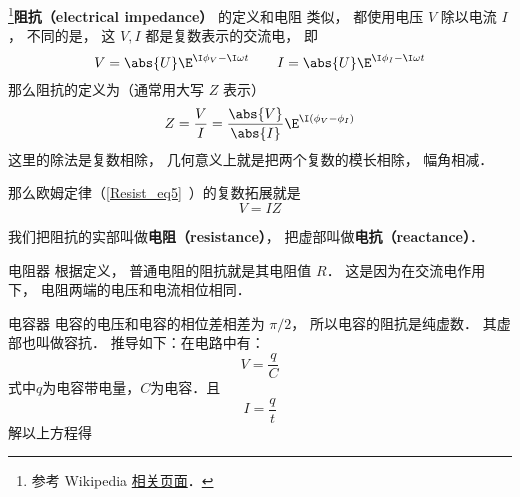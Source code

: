 
\begin{issues}
\issueDraft
\end{issues}


\footnote{参考 Wikipedia \href{https://en.wikipedia.org/wiki/Electrical_impedance}{相关页面}．}\textbf{阻抗（electrical impedance）} 的定义和电阻 类似， 都使用电压 $V$ 除以电流 $I$， 不同的是， 这 $V, I$ 都是复数表示的交流电， 即
\begin{equation}
V = \abs{U} \E^{\I \phi_V - \I \omega t}
\qquad
I = \abs{U} \E^{\I \phi_I - \I \omega t}
\end{equation}
那么阻抗的定义为（通常用大写 $Z$ 表示）
\begin{equation}
Z = \frac{V}{I} = \frac{\abs{V}}{\abs{I}} \E^{\I (\phi_V - \phi_I)}
\end{equation}
这里的除法是复数相除， 几何意义上就是把两个复数的模长相除， 幅角相减．

那么欧姆定律（\autoref{Resist_eq5}~）的复数拓展就是
\begin{equation}
V = IZ
\end{equation}

我们把阻抗的实部叫做\textbf{电阻（resistance）}， 把虚部叫做\textbf{电抗（reactance）}．

\begin{example}{电阻器}\label{impeda_ex1}
根据定义， 普通电阻的阻抗就是其电阻值 $R$． 这是因为在交流电作用下， 电阻两端的电压和电流相位相同．
\end{example}

\begin{example}{电容器}
电容的电压和电容的相位差相差为 $\pi/2$， 所以电容的阻抗是纯虚数． 其虚部也叫做容抗．
推导如下：在电路中有：
\begin{equation}
V=\frac{q}{C}
\end{equation}
式中$q$为电容带电量，$C$为电容．且
\begin{equation}
I=\frac{q}{t}
\end{equation}
解以上方程得
\end{example}


